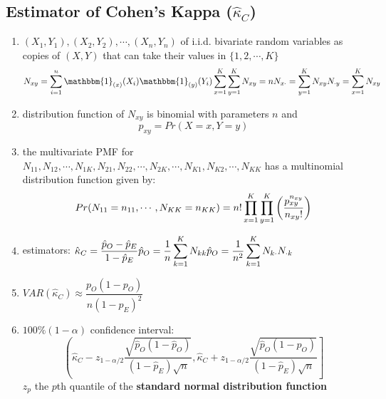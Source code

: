 \subsection{Estimator of Cohen’s Kappa ($\hat{\kappa}_C$) \cite{ism-1}} \label{Multivariate Distributions: Estimator of Cohen’s Kappa}


\begin{enumerate}
    \item $(X_1, Y_1), (X_2, Y_2), \cdots , (X_n, Y_n)$ of i.i.d. bivariate random variables as copies of $(X, Y)$ that can take their values in $\{1, 2,\cdots, K\}$
    \[
        \hfill
        N_{xy} = \dsum_{i=1}^{n}
        \mathbbm{1}_{(x)}(X_i) \mathbbm{1}_{(y)}(Y_i)
        \hfill
        \dsum_{x=1}^{K} \dsum_{y=1}^{K} N_{xy} = n
        \hfill
        N_{x\cdot} = \dsum_{y=1}^{K} N_{xy}
        \hfill
        N_{\cdot y} = \dsum_{x=1}^{K} N_{xy}
        \hfill
    \]

    \item distribution function of $N_{xy}$ is binomial with parameters $n$ and 
    \[
        p_{xy} = Pr(X = x, Y = y)
    \]

    \item the multivariate PMF for $N_{11}, N_{12},\cdots, N_{1K}, N_{21}, N_{22},\cdots, N_{2K} , \cdots, N_{K1}, N_{K2},\cdots, N_{KK}$ has a multinomial distribution function given by:
    \[
        Pr(N_{11}=n_{11},\cdots,N_{KK}=n_{KK})
        = n!\displaystyle\prod_{x=1}^{K} \displaystyle\prod_{y=1}^{K}
        \left( \dfrac{p_{xy}^{n_{xy}}}{n_{xy}!} \right)
    \]

    \item estimators: $
        \hfill
        \hat{\kappa}_C = \dfrac{\hat{p}_O - \hat{p}_E}{1 - \hat{p}_E}
        \hfill
        \hat{p}_O = \dfrac{1}{n} \dsum_{k=1}^K N_{kk}
        \hfill
        \hat{p}_O = \dfrac{1}{n^2} \dsum_{k=1}^K 
        N_{k\cdot}N_{\cdot k}
        \hfill
    $
    
    \item $
        VAR(\hat{\kappa}_C)
        \approx \dfrac{p_O(1 - p_O)}{n(1 - p_E)^2}
    $

    \item $100\%(1 - \alpha)$ confidence interval:
    \[\left(
        \hat{\kappa}_C - z_{1-\alpha/2}
        \dfrac{\sqrt{\hat{p}_O(1-\hat{p}_O)}}{(1 - \hat{p}_E)\sqrt{n}},
        \hat{\kappa}_C + z_{1-\alpha/2}
        \dfrac{\sqrt{\hat{p}_O(1-\hat{p}_O)}}{(1 - \hat{p}_E)\sqrt{n}}
    \right]\]
    $z_p$ the $p$th quantile of the \textbf{standard normal distribution function}

    
\end{enumerate}

